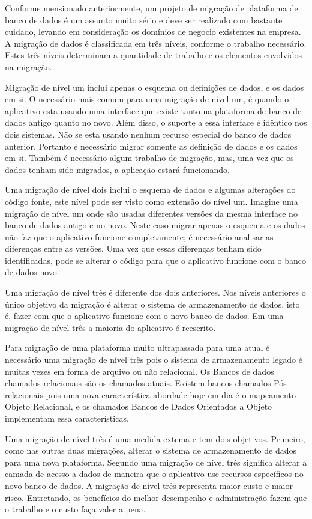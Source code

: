 Conforme mensionado anteriormente, um projeto de migração de plataforma de banco de dados é um assunto muito sério e deve ser realizado com bastante cuidado, levando em consideração os domínios de negocio existentes na empresa. A migração de dados é classificada em três níveis, conforme o trabalho necessário. Estes três níveis determinam a quantidade de trabalho e os elementos envolvidos na migração.

Migração de nível um inclui apenas o esquema ou definições de dados, e os dados em si. O necessário mais comum para uma migração de nível um, é quando o aplicativo esta usando uma interface que existe tanto na plataforma de banco de dados antigo quanto no novo. Além disso, o suporte a essa interface é idêntico nos dois sistemas. Não se esta usando nenhum recurso especial do banco de dados anterior. Portanto é necessário migrar somente as definição de dados e os dados em si. Também é necessário algum trabalho de migração, mas, uma vez que os dados tenham sido migrados, a aplicação estará funcionando.

Uma migração de nível dois inclui o esquema de dados e algumas alterações do código fonte, este nível pode ser visto como extensão do nível um. Imagine uma migração de nível um onde são usadas diferentes versões da mesma interface no banco de dados antigo e no novo. Neste caso migrar apenas o esquema e os dados não faz que o aplicativo funcione completamente; é necessário analisar as diferenças entre as versões. Uma vez que essas diferenças tenham sido identificadas, pode se alterar o código para que o aplicativo funcione com o banco de dados novo.

Uma migração de nível três é diferente dos dois anteriores. Nos níveis anteriores o único objetivo da migração é alterar o sistema de armazenamento de dados, isto é, fazer com que o aplicativo funcione com o novo banco de dados. Em uma migração de nível três a maioria do aplicativo é reescrito.

Para migração de uma plataforma muito ultrapassada para uma atual é necessário uma migração de nível três pois o sistema de armazenamento legado é muitas vezes em forma de arquivo ou não relacional. Os Bancos de dados chamados relacionais são os chamados atuais. Existem bancos chamados Pós-relacionais pois uma nova característica abordade hoje em dia é o mapeamento Objeto Relacional, e os chamados Bancos de Dados Orientados a Objeto implementam essa características.

Uma migração de nível três é uma medida extema e tem dois objetivos. Primeiro, como nas outras duas migrações, alterar o sistema de armazenamento de dados para uma nova plataforma. Segundo uma migração de nível três significa alterar a camada de acesso a dados de maneira que o aplicativo use recursos específicos no novo banco de dados. A migração de nível três representa maior custo e maior risco. Entretando, os benefícios do melhor desempenho e administração fazem que o trabalho e o custo faça valer a pena.

